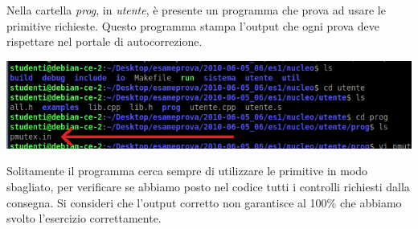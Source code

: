 \documentclass[11pt]{report}
\theoremstyle{definition}
\begin{document}
\begin{itemize}
	Nella cartella \emph{prog}, in \emph{utente}, è presente un programma che prova ad usare le primitive richieste. Questo programma stampa l'output che ogni prova deve rispettare nel portale di autocorrezione.
	\begin{center}
		\includegraphics{img/207.PNG}
	\end{center}
	Solitamente il programma cerca sempre di utilizzare le primitive in modo sbagliato, per verificare se abbiamo posto nel codice tutti i controlli richiesti dalla consegna. Si consideri che l'output corretto non garantisce al 100\% che abbiamo svolto l'esercizio correttamente.
\end{itemize}
\end{document}
